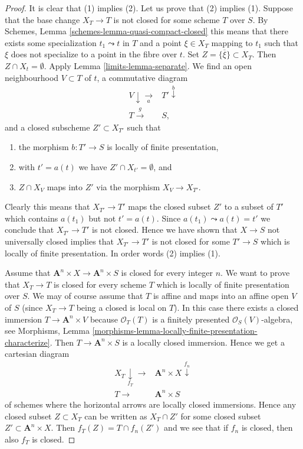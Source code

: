 \begin{proof}

It is clear that (1) implies (2). Let us prove that (2) implies (1).
Suppose that the base change $X_T \to T$ is not closed for some
scheme $T$ over $S$. By
Schemes, Lemma \ref{schemes-lemma-quasi-compact-closed}
this means that there exists some specialization $t_1 \leadsto t$ in
$T$ and a point $\xi \in X_T$ mapping to $t_1$ such that $\xi$ does not
specialize to a point in the fibre over $t$. Set
$Z = \overline{\{\xi\}} \subset X_T$. Then $Z \cap X_t = \emptyset$. Apply
Lemma \ref{limits-lemma-separate}.
We find an open neighbourhood $V \subset T$ of $t$, a commutative diagram
$$
\begin{array}{cc}V \downarrow\underset{a}{\longrightarrow} & T' \overset{b}{\downarrow} \\ T \overset{g}{\longrightarrow} & S,\end{array}
$$
and a closed subscheme $Z' \subset X_{T'}$ such that
\begin{enumerate}
\item the morphism $b : T' \to S$ is locally of finite presentation,
\item with $t' = a(t)$ we have $Z' \cap X_{t'} = \emptyset$, and
\item $Z \cap X_V$ maps into $Z'$ via the morphism $X_V \to X_{T'}$.
\end{enumerate}
Clearly this means that $X_{T'} \to T'$ maps the closed subset $Z'$
to a subset of $T'$ which contains $a(t_1)$ but not $t' = a(t)$.
Since $a(t_1) \leadsto a(t) = t'$ we conclude that $X_{T'} \to T'$
is not closed. Hence we have shown that $X \to S$ not universally closed
implies that $X_{T'} \to T'$ is not closed for some $T' \to S$
which is locally of finite presentation. In order words (2)
implies (1).

\medskip\noindent
Assume that $\mathbf{A}^n \times X \to \mathbf{A}^n \times S$ is
closed for every integer $n$. We want to prove that $X_T \to T$ is
closed for every scheme $T$ which is locally of finite presentation
over $S$. We may of course assume that $T$ is affine and maps into
an affine open $V$ of $S$ (since $X_T \to T$ being a closed is local on $T$).
In this case there exists a closed immersion $T \to \mathbf{A}^n \times V$
because $\mathcal{O}_T(T)$ is a finitely presented
$\mathcal{O}_S(V)$-algebra, see
Morphisms,
Lemma \ref{morphisms-lemma-locally-finite-presentation-characterize}.
Then $T \to \mathbf{A}^n \times S$ is a locally closed immersion.
Hence we get a cartesian diagram
$$
\begin{array}{cc}X_T \underset{f_T}{\downarrow}\longrightarrow & \mathbf{A}^n \times X \overset{f_n}{\downarrow} \\ T \longrightarrow & \mathbf{A}^n \times S\end{array}
$$
of schemes where the horizontal arrows are locally closed immersions.
Hence any closed subset $Z \subset X_T$ can be written as
$X_T \cap Z'$ for some closed subset $Z' \subset \mathbf{A}^n \times X$.
Then $f_T(Z) = T \cap f_n(Z')$ and we see that if $f_n$ is closed, then
also $f_T$ is closed.
\end{proof}

